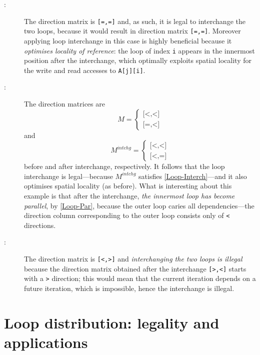 \begin{description}
\item[:] The direction matrix is
  \texttt{[=,=]} and, as such, it is legal to interchange the two
  loops, because it would result in direction matrix
  \texttt{[=,=]}. Moreover applying loop interchange in this case is
  highly beneficial because it \emph{optimises locality of reference}:
  the loop of index \texttt{i} appears in the innermost position after
  the interchange, which optimally exploits spatial locality for the
  write and read accesses to \texttt{A[j][i]}.

\item[:] The direction matrices are
  \[
    M
    = \begin{cases}\texttt{[<,<]}\\\texttt{[=,<]}\end{cases}
  \]
  and
  \[
    M^{intchg}
    = \begin{cases}\texttt{[<,<]}\\\texttt{[<,=]}\end{cases}
  \]
  before and after interchange, respectively.  It follows that the
  loop interchange is legal---because $M^{intchg}$ satisfies
  \cref{Loop-Interch}---and it also optimises spatial locality (as
  before).  What is interesting about this example is that after the
  interchange, \emph{the innermost loop has become parallel}, by
  \cref{Loop-Par}, because the outer loop caries all
  dependencies---the direction column corresponding to the outer loop
  consists only of \texttt{<} directions.

\item[:] The direction matrix is
  \texttt{[<,>]} and \emph{interchanging the two loops is illegal}
  because the direction matrix obtained after the interchange
  \texttt{[>,<]} starts with a \texttt{>} direction; this would mean
  that the current iteration depends on a future iteration, which is
  impossible, hence the interchange is illegal.
\end{description}

\section{Loop distribution: legality and applications}
\label{sec:loop-distrib}

